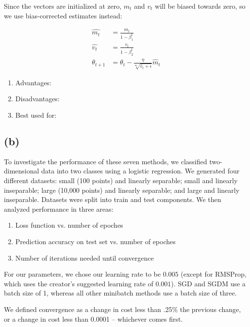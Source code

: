 \documentclass[twoside,11pt]{homework}
\begin{document}
Since the vectors are initialized at zero, $m_t$ and $v_t$ will be biased towards zero, so we use bias-corrected estimates instead:

\begin{align*}
	\hat{m_t} &= \frac{m_t}{1-\beta^t_1}\\
	\hat{v_t} &= \frac{v_t}{1-\beta^t_2}\\
	\theta_{t+1} &= \theta_t - \frac{\eta}{\sqrt[•]{\hat{v}_t+\epsilon}}\hat{m}_t
\end{align*}

\begin{enumerate}
	\item Advantages:
	\item Disadvantages:
	\item Best used for:
\end{enumerate}

\subsection{(b)}
To investigate the performance of these seven methods, we classified two-dimensional data into two classes using a logistic regression. We generated four different datasets: small (100 points) and linearly separable; small and linearly inseparable; large (10,000 points) and linearly separable; and large and linearly inseparable. Datasets were split into train and test components. We then analyzed performance in three areas:

\begin{enumerate}
	\item Loss function vs. number of epoches
	\item Prediction accuracy on test set vs. number of epoches
	\item Number of iterations needed until convergence
\end{enumerate}

For our parameters, we chose our learning rate to be $0.005$ (except for RMSProp, which uses the creator's suggested learning rate of $0.001$). SGD and SGDM use a batch size of 1, whereas all other minibatch methods use a batch size of three.

We defined convergence as a change in cost less than .25\% the previous change, or a change in cost less than 0.0001 -- whichever comes first.
\end{document}

